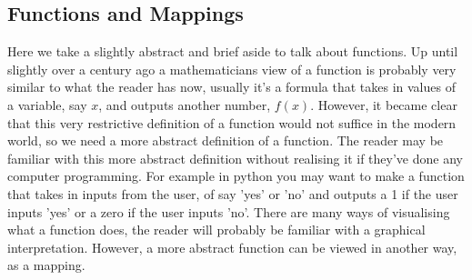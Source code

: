 \subsection{Functions and Mappings}
Here we take a slightly abstract and brief aside to talk about functions. 
Up until slightly over a century ago a mathematicians view of a function is probably very similar to what the reader has now, usually it's a formula that takes in values of a variable, say $x$, and outputs another number, $f(x)$. However, it became clear that this very restrictive definition of a function would not suffice in the modern world, so we need a more abstract definition of a function.
 The reader may be familiar with this more abstract definition without realising it if they've done any computer programming.
  For example in python you may want to make a function that takes in inputs from the user, of say 'yes' or 'no' and outputs a 1 if the user inputs 'yes' or a zero if the user inputs 'no'.
   There are many ways of visualising what a function does, the reader will probably be familiar with a graphical interpretation.
    However, a more abstract function can be viewed in another way, as a mapping. 
    
